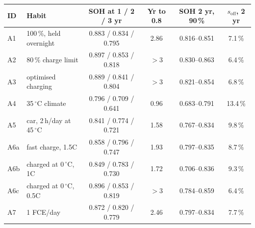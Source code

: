 \begin{tabular}{@{}llcccc@{}}
\toprule
ID & Habit & SOH at 1 / 2 / 3 yr & Yr to 0.8 & SOH 2 yr, 90\,\% & $s_\mathrm{off}$, 2 yr \\
\midrule
A1 & 100\,\%, held overnight & 0.883 / 0.834 / 0.795 & 2.86 & 0.816--0.851 & 7.1\,\% \\
A2 & 80\,\% charge limit & 0.897 / 0.853 / 0.818 & $>3$ & 0.830--0.863 & 6.4\,\% \\
A3 & optimised charging & 0.889 / 0.841 / 0.804 & $>3$ & 0.821--0.854 & 6.8\,\% \\
A4 & 35\,$^\circ$C climate & 0.796 / 0.709 / 0.641 & 0.96 & 0.683--0.791 & 13.4\,\% \\
A5 & car, 2\,h/day at 45\,$^\circ$C & 0.841 / 0.774 / 0.721 & 1.58 & 0.767--0.834 & 9.8\,\% \\
A6a & fast charge, 1.5C & 0.858 / 0.796 / 0.747 & 1.93 & 0.797--0.835 & 8.7\,\% \\
A6b & charged at 0\,$^\circ$C, 1C & 0.849 / 0.783 / 0.730 & 1.72 & 0.706--0.836 & 9.3\,\% \\
A6c & charged at 0\,$^\circ$C, 0.5C & 0.896 / 0.853 / 0.819 & $>3$ & 0.784--0.859 & 6.4\,\% \\
A7 & 1 FCE/day & 0.872 / 0.820 / 0.779 & 2.46 & 0.797--0.834 & 7.7\,\% \\
\bottomrule
\end{tabular}
